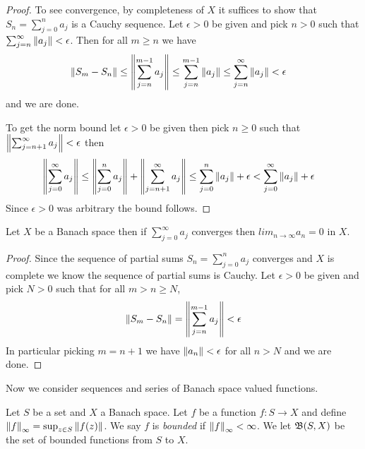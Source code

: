 \begin{proof}
To see convergence, by completeness of $X$ it suffices to show that $S_n = \sum_{j=0}^n
a_j$ is a Cauchy sequence.  Let $\epsilon > 0$ be given and pick $n >
0$ such that $\sum_{j=n}^\infty \left \lVert a_j \right \rVert < \epsilon$.  Then for all
$m \geq n$ we have
\begin{align*}
  \left \lVert S_m - S_n \right \rVert 
  &\leq \left \lVert \sum_{j=n}^{m-1} a_j \right \rVert 
    \leq \sum_{j=n}^{m-1}\left \lVert  a_j \right \rVert 
    \leq \sum_{j=n}^{\infty}\left \lVert  a_j \right \rVert 
    < \epsilon
\end{align*}
and we are done.

To get the norm bound let $\epsilon > 0$ be given then pick $n \geq 0$
such that $\left \lVert \sum_{j=n+1}^\infty a_j \right \rVert < \epsilon$ then
\begin{align*}
  \left \lVert \sum_{j=0}^\infty a_j \right \rVert &\leq \left \lVert \sum_{j=0}^n a_j \right \rVert +
                                 \left \lVert \sum_{j=n+1}^\infty a_j \right \rVert
                                 \leq \sum_{j=0}^n \left \lVert  a_j \right \rVert +
                                 \epsilon < \sum_{j=0}^\infty \left \lVert  a_j \right \rVert +
                                 \epsilon 
\end{align*}
Since $\epsilon>0$ was arbitrary the bound follows.
\end{proof}
\begin{prop}\label{banach:ConvergenceOfSeriesImpliesTermsConvergeToZero}Let $X$ be a Banach space then if $\sum_{j=0}^\infty a_j$
  converges then $lim_{n \to \infty} a_n = 0$  in $X$.
\end{prop}
\begin{proof}
Since the sequence of partial sums $S_n = \sum_{j=0}^n a_j$ converges and $X$ is complete we
know the sequence of partial sums is Cauchy.   Let $\epsilon > 0$ be
given and pick $N>0$ such that for all $m > n \geq N$,
\begin{align*}
  \left \lVert S_m - S_n \right \rVert = \left \lVert \sum_{j=n}^{m-1} a_j \right \rVert < \epsilon
\end{align*}
In particular picking $m = n+1$ we have $\left \lVert a_n \right \rVert < \epsilon$ for
all $n > N$ and we are done.
\end{proof}

Now we consider sequences and series of Banach space valued functions.
\begin{defn}Let $S$ be a set and $X$ a Banach space.   Let $f$ be a
  function $f : S \to X$  and define $\left \lVert f \right \rVert_\infty = \sup_{z \in S}
  \left \lVert f(z) \right \rVert$.   We say $f$ is \emph{bounded} if $\left \lVert f \right \rVert_\infty <
  \infty$.  We let $\mathfrak{B}(S, X)$ be the set of bounded
  functions from $S$ to $X$.
\end{defn}
  
